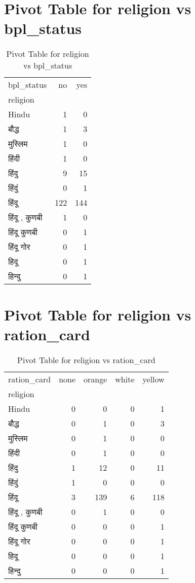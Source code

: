 \documentclass{article}
\begin{document}
\section{Pivot Table for religion vs bpl_status}
\begin{table}
\caption{Pivot Table for religion vs bpl_status}
\label{tab:religion_bpl_status}
\begin{tabular}{lrr}
\toprule
bpl_status & no & yes \\
religion &  &  \\
\midrule
Hindu & 1 & 0 \\
बौद्ध & 1 & 3 \\
मुस्लिम & 1 & 0 \\
हिंदी & 1 & 0 \\
हिंदु & 9 & 15 \\
हिंदुं & 0 & 1 \\
हिंदू & 122 & 144 \\
हिंदू , कुणबी & 1 & 0 \\
हिंदू कुणबी & 0 & 1 \\
हिंदू गोर & 0 & 1 \\
हिदू & 0 & 1 \\
हिन्दु & 0 & 1 \\
\bottomrule
\end{tabular}
\end{table}

\section{Pivot Table for religion vs ration_card}
\begin{table}
\caption{Pivot Table for religion vs ration_card}
\label{tab:religion_ration_card}
\begin{tabular}{lrrrr}
\toprule
ration_card & none & orange & white & yellow \\
religion &  &  &  &  \\
\midrule
Hindu & 0 & 0 & 0 & 1 \\
बौद्ध & 0 & 1 & 0 & 3 \\
मुस्लिम & 0 & 1 & 0 & 0 \\
हिंदी & 0 & 1 & 0 & 0 \\
हिंदु & 1 & 12 & 0 & 11 \\
हिंदुं & 1 & 0 & 0 & 0 \\
हिंदू & 3 & 139 & 6 & 118 \\
हिंदू , कुणबी & 0 & 1 & 0 & 0 \\
हिंदू कुणबी & 0 & 0 & 0 & 1 \\
हिंदू गोर & 0 & 0 & 0 & 1 \\
हिदू & 0 & 0 & 0 & 1 \\
हिन्दु & 0 & 0 & 0 & 1 \\
\bottomrule
\end{tabular}
\end{table}
\end{document}
